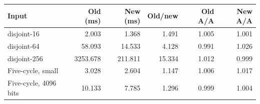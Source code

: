 \begin{tabular}{lrrrrr}
\toprule
Input & Old (ms) & New (ms) & Old/new & Old A/A & New A/A \\
\midrule
disjoint-16 & 2.003 & 1.368 & 1.491 & 1.005 & 1.001 \\
disjoint-64 & 58.093 & 14.533 & 4.128 & 0.991 & 1.026 \\
disjoint-256 & 3253.678 & 211.811 & 15.334 & 1.012 & 0.999 \\
Five-cycle, small & 3.028 & 2.604 & 1.147 & 1.006 & 1.017 \\
Five-cycle, 4096 bits & 10.133 & 7.785 & 1.296 & 0.999 & 1.004 \\
\bottomrule
\end{tabular}
